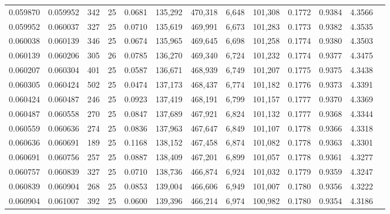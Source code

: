 \begin{tabular}{rrrrrrrrrrrrr}
0.059870 & 0.059952 &   342 &  25 &                                     0.0681 & 135,292 & 470,318 &   6,648 & 101,308 & 0.1772 & 0.9384 & 4.3566 \\
0.059952 & 0.060037 &   327 &  25 &                                     0.0710 & 135,619 & 469,991 &   6,673 & 101,283 & 0.1773 & 0.9382 & 4.3535 \\
0.060038 & 0.060139 &   346 &  25 &                                     0.0674 & 135,965 & 469,645 &   6,698 & 101,258 & 0.1774 & 0.9380 & 4.3503 \\
0.060139 & 0.060206 &   305 &  26 &                                     0.0785 & 136,270 & 469,340 &   6,724 & 101,232 & 0.1774 & 0.9377 & 4.3475 \\
0.060207 & 0.060304 &   401 &  25 &                                     0.0587 & 136,671 & 468,939 &   6,749 & 101,207 & 0.1775 & 0.9375 & 4.3438 \\
0.060305 & 0.060424 &   502 &  25 &                                     0.0474 & 137,173 & 468,437 &   6,774 & 101,182 & 0.1776 & 0.9373 & 4.3391 \\
0.060424 & 0.060487 &   246 &  25 &                                     0.0923 & 137,419 & 468,191 &   6,799 & 101,157 & 0.1777 & 0.9370 & 4.3369 \\
0.060487 & 0.060558 &   270 &  25 &                                     0.0847 & 137,689 & 467,921 &   6,824 & 101,132 & 0.1777 & 0.9368 & 4.3344 \\
0.060559 & 0.060636 &   274 &  25 &                                     0.0836 & 137,963 & 467,647 &   6,849 & 101,107 & 0.1778 & 0.9366 & 4.3318 \\
0.060636 & 0.060691 &   189 &  25 &                                     0.1168 & 138,152 & 467,458 &   6,874 & 101,082 & 0.1778 & 0.9363 & 4.3301 \\
0.060691 & 0.060756 &   257 &  25 &                                     0.0887 & 138,409 & 467,201 &   6,899 & 101,057 & 0.1778 & 0.9361 & 4.3277 \\
0.060757 & 0.060839 &   327 &  25 &                                     0.0710 & 138,736 & 466,874 &   6,924 & 101,032 & 0.1779 & 0.9359 & 4.3247 \\
0.060839 & 0.060904 &   268 &  25 &                                     0.0853 & 139,004 & 466,606 &   6,949 & 101,007 & 0.1780 & 0.9356 & 4.3222 \\
0.060904 & 0.061007 &   392 &  25 &                                     0.0600 & 139,396 & 466,214 &   6,974 & 100,982 & 0.1780 & 0.9354 & 4.3186 \\

\end{tabular}
